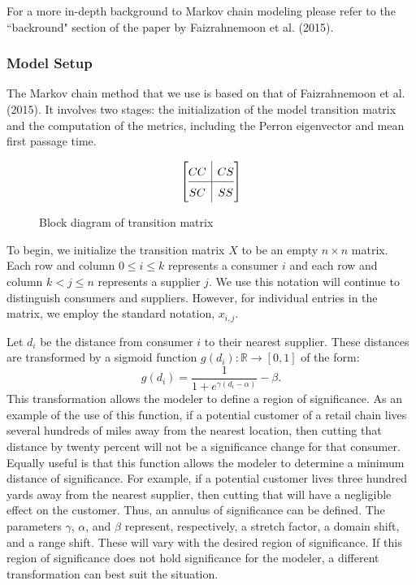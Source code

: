 \documentclass[twoside,twocolumn]{article}
\begin{document}
For a more in-depth background to Markov chain modeling please refer to the ``backround" section of the paper by Faizrahnemoon et al. (2015).


\subsubsection{Model Setup}

The Markov chain method that we use is based on that of Faizrahnemoon et al. (2015).
It involves two stages: the initialization of the model transition matrix and the computation of the metrics, including the Perron eigenvector and mean first passage time.

\begin{figure}
\[
\renewcommand{\arraystretch}{1.5}
\left[\begin{array}{@{}c|c@{}}
  CC &
  CS
\\ \hline
  SC
  & SS
\end{array}\right]
\]
\caption{Block diagram of transition matrix}
\end{figure}


To begin, we initialize the transition matrix $X$ to be an empty $n \times n$ matrix.
Each row and column $0 \leq i \leq k$ represents a consumer $i$ and each row and column $k < j \leq n$ represents a supplier $j$.
We use this notation will continue to distinguish consumers and suppliers.
However, for individual entries in the matrix, we employ the standard notation, $x_{i,j}$.

Let $d_{i}$ be the distance from consumer $i$ to their nearest supplier.
These distances are transformed by a sigmoid function $g(d_i): \mathbb{R} \rightarrow [0,1]$ of the form:
\begin{equation}
g(d_i) = \frac{1}{1 + e^{\gamma(d_i-\alpha)}} - \beta.
\end{equation}
This transformation allows the modeler to define a region of significance.
As an example of the use of this function, if a potential customer of a retail chain lives several hundreds of miles away from the nearest location, then cutting that distance by twenty percent will not be a significance change for that consumer.
Equally useful is that this function allows the modeler to determine a minimum distance of significance.
For example, if a potential customer lives three hundred yards away from the nearest supplier, then cutting that will have a negligible effect on the customer.
Thus, an annulus of significance can be defined.
The parameters $\gamma$, $\alpha$, and $\beta$ represent, respectively, a stretch factor, a domain shift, and a range shift.
These will vary with the desired region of significance.
If this region of significance does not hold significance for the modeler, a different transformation can best suit the situation.
\end{document}
